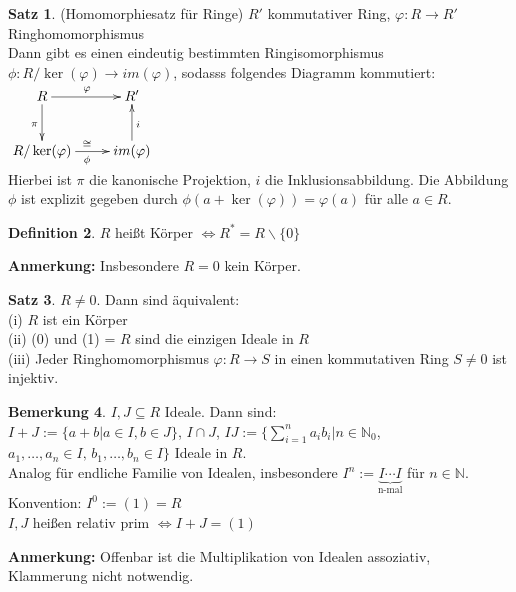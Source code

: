 \documentclass[10pt,a4paper,numbers=endperiod]{scrreprt}
\theoremstyle{definition}
\newtheorem{satz}{Satz}[section]
\newtheorem{defi}[satz]{Definition}
\newtheorem{bem}[satz]{Bemerkung}
\def\NN{{\mathbb N}}
\begin{document}
\begin{satz}
	(Homomorphiesatz für Ringe) $R'$ kommutativer Ring, $\varphi: R \rightarrow R'$ Ringhomomorphismus\\
	Dann gibt es einen eindeutig bestimmten Ringisomorphismus\\
	$\phi: R/\ker(\varphi) \rightarrow im(\varphi)$, sodasss folgendes Diagramm kommutiert:\\
	$\begin{xy}
	\xymatrix{
		R \ar[r]^{\varphi} \ar[d]_\pi    &   R'  \\
		R/\ker(\varphi) \ar[r]_{\phi}^{\cong} &   im(\varphi) \ar[u]_i
	}
	\end{xy}$\\
	Hierbei ist $\pi$ die kanonische Projektion, $i$ die Inklusionsabbildung. Die Abbildung $\phi$ ist explizit gegeben durch $\phi(a + \ker(\varphi)) = \varphi(a)$ für alle $a \in R$.
\end{satz}

\begin{defi}
	$R$ heißt Körper $\Leftrightarrow R^* = R \backslash \{0\}$
\end{defi}

\textbf{Anmerkung:} Insbesondere $R = 0$ kein Körper.

\begin{satz}
	$R \neq 0$. Dann sind äquivalent:\\
	(i) $R$ ist ein Körper\\
	(ii) (0) und (1) = $R$ sind die einzigen Ideale in $R$\\
	(iii) Jeder Ringhomomorphismus $\varphi: R \rightarrow S$ in einen kommutativen Ring $S \neq 0$ ist injektiv.
\end{satz}

\begin{bem}
	$I, J \subseteq R$ Ideale. Dann sind:\\
	$I+J := \{a+b| a \in I, b \in J\}$, $I \cap J$, $IJ := \{ \sum\limits_{i = 1}^{n} a_ib_i| n \in \NN_0$, $a_1, \ldots, a_n \in I \text{, } b_1, \ldots, b_n \in I\}$ Ideale in $R$.\\
	Analog für endliche Familie von Idealen, insbesondere $I^n := \underbrace{I \cdots I}_{\text{n-mal}}$ für $n \in \NN$.\\
	Konvention: $I^0 := (1) = R$\\
	$I, J$ heißen relativ prim $\Leftrightarrow I +J = (1)$
\end{bem}

\textbf{Anmerkung:} Offenbar ist die Multiplikation von Idealen assoziativ, Klammerung nicht notwendig.
\end{document}
